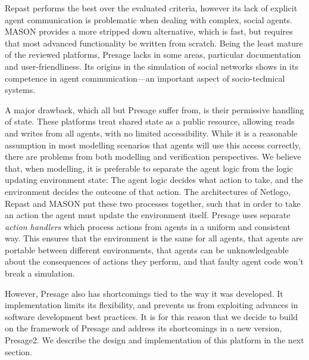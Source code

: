 Repast performs the best over the evaluated criteria, however its lack of
explicit agent communication is problematic when dealing with complex, social
agents. MASON provides a more stripped down alternative, which is fast, but
requires that most advanced functionality be written from scratch. Being the
least mature of the reviewed platforms, Presage lacks in some areas,
particular documentation and user-friendliness. Its origins in the simulation
of social networks shows in its competence in agent communication---an
important aspect of socio-technical systems.

A major drawback, which all but Presage suffer from, is their permissive
handling of state. These platforms treat shared state as a public resource,
allowing reads and writes from all agents, with no limited accessibility.
While it is a reasonable assumption in most modelling scenarios that agents
will use this access correctly, there are problems from both modelling and
verification perspectives. We believe that, when modelling, it is preferable
to separate the agent logic from the logic updating environment state: The
agent logic decides what action to take, and the environment decides the
outcome of that action. The architectures of Netlogo, Repast and MASON put
these two processes together, such that in order to take an action the agent
must update the environment itself. Presage uses separate \emph{action
handlers} which process actions from agents in a uniform and consistent way.
This ensures that the environment is the same for all agents, that agents are
portable between different environments, that agents can be unknowledgeable
about the consequences of actions they perform, and that faulty agent code
won't break a simulation.

However, Presage also has shortcomings tied to the way it was developed. It implementation limits its flexibility, and prevents us from exploiting advances in software development best practices. It is for this reason that we decide to build on the framework of Presage and address its shortcomings in a new version, Presage2. We describe the design and implementation of this platform in the next section.




